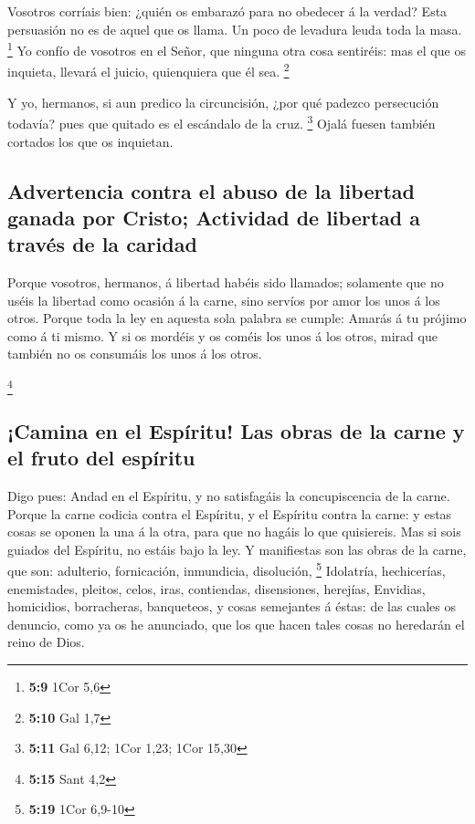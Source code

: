  Vosotros corríais bien: ¿quién os embarazó para no obedecer
á la verdad?  Esta persuasión no es de aquel que os llama.
 Un poco de levadura leuda toda la masa. \footnote{\textbf{5:9}
  1Cor 5,6}  Yo confío de vosotros en el Señor, que ninguna
otra cosa sentiréis: mas el que os inquieta, llevará el juicio,
quienquiera que él sea. \footnote{\textbf{5:10} Gal 1,7}

 Y yo, hermanos, si aun predico la circuncisión, ¿por qué
padezco persecución todavía? pues que quitado es el escándalo de la
cruz. \footnote{\textbf{5:11} Gal 6,12; 1Cor 1,23; 1Cor 15,30}
 Ojalá fuesen también cortados los que os inquietan.

\hypertarget{advertencia-contra-el-abuso-de-la-libertad-ganada-por-cristo-actividad-de-libertad-a-travuxe9s-de-la-caridad}{%
\subsection{Advertencia contra el abuso de la libertad ganada por
Cristo; Actividad de libertad a través de la
caridad}\label{advertencia-contra-el-abuso-de-la-libertad-ganada-por-cristo-actividad-de-libertad-a-travuxe9s-de-la-caridad}}

 Porque vosotros, hermanos, á libertad habéis sido
llamados; solamente que no uséis la libertad como ocasión á la carne,
sino servíos por amor los unos á los otros.  Porque toda la
ley en aquesta sola palabra se cumple: Amarás á tu prójimo como á ti
mismo.  Y si os mordéis y os coméis los unos á los otros,
mirad que también no os consumáis los unos á los otros.

\footnote{\textbf{5:15} Sant 4,2}

\hypertarget{camina-en-el-espuxedritu-las-obras-de-la-carne-y-el-fruto-del-espuxedritu}{%
\subsection{¡Camina en el Espíritu! Las obras de la carne y el fruto del
espíritu}\label{camina-en-el-espuxedritu-las-obras-de-la-carne-y-el-fruto-del-espuxedritu}}

 Digo pues: Andad en el Espíritu, y no satisfagáis la
concupiscencia de la carne.  Porque la carne codicia contra
el Espíritu, y el Espíritu contra la carne: y estas cosas se oponen la
una á la otra, para que no hagáis lo que quisiereis.  Mas
si sois guiados del Espíritu, no estáis bajo la ley.  Y
manifiestas son las obras de la carne, que son: adulterio, fornicación,
inmundicia, disolución, \footnote{\textbf{5:19} 1Cor 6,9-10}
 Idolatría, hechicerías, enemistades, pleitos, celos, iras,
contiendas, disensiones, herejías,  Envidias, homicidios,
borracheras, banqueteos, y cosas semejantes á éstas: de las cuales os
denuncio, como ya os he anunciado, que los que hacen tales cosas no
heredarán el reino de Dios.

